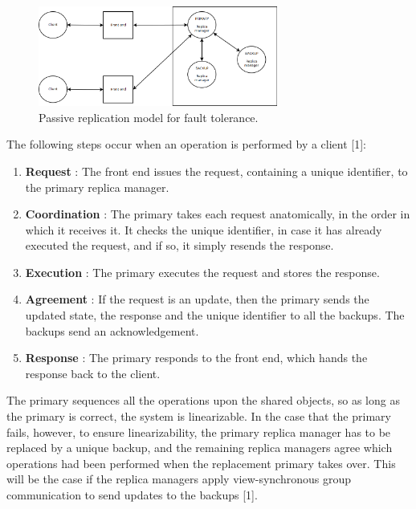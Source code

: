 \begin{figure}
	\begin{center}
		\includegraphics[width=0.7\textwidth]{img/passivereplication}
	\end{center}
	\caption{Passive replication model for fault tolerance.}
	\label{fig:passivereplication}
\end{figure}

The following steps occur when an operation is performed by a client [1]:
\begin{enumerate}
	\item \textbf{Request} : The front end issues the request, containing a unique identifier, to the primary replica manager.
	\item \textbf{Coordination} : The primary takes each request anatomically, in the order in which it receives it. It checks the unique identifier, in case it has already executed the request, and if so, it simply resends the response.
	\item \textbf{Execution} : The primary executes the request and stores the response.
	\item \textbf{Agreement} : If the request is an update, then the primary sends the updated state, the response and the unique identifier to all the backups. The backups send an acknowledgement.
	\item \textbf{Response} : The primary responds to the front end, which hands the response back to the client.
\end{enumerate}

The primary sequences all the operations upon the shared objects, so as long as the primary is correct, the system is linearizable. In the case that the primary fails, however, to ensure linearizability, the primary replica manager has to be replaced by a unique backup, and the remaining replica managers agree which operations had been performed when the replacement primary takes over. This will be the case if the replica managers apply view-synchronous group communication to send updates to the backups [1].



